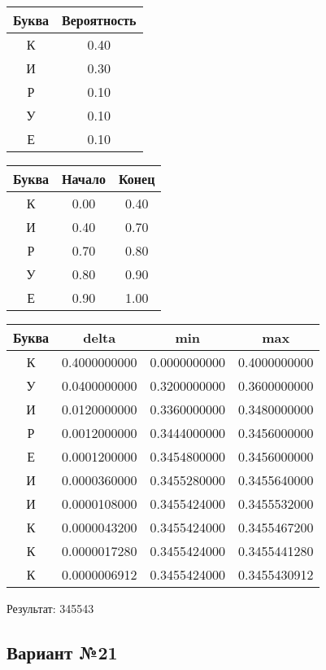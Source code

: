 \documentclass[a4paper, 12pt]{article}
\begin{document}
\begin{center}
 \begin{tabular}{ |c|c| } 
  \hline
     Буква & Вероятность \\ \hline
К & 0.40\\\hline
И & 0.30\\\hline
Р & 0.10\\\hline
У & 0.10\\\hline
Е & 0.10
\\ \hline \end{tabular}
\end{center}
\begin{center}
 \begin{tabular}{ |c|c|c| } 
  \hline
     Буква & Начало & Конец \\ \hline
К & 0.00 & 0.40\\\hline
И & 0.40 & 0.70\\\hline
Р & 0.70 & 0.80\\\hline
У & 0.80 & 0.90\\\hline
Е & 0.90 & 1.00
\\ \hline \end{tabular}
\end{center}
\begin{center}
 \begin{tabular}{ |c|c|c|c| } 
  \hline
     Буква & delta & min & max \\ \hline
К & 0.4000000000 & 0.0000000000 & 0.4000000000\\\hline
У & 0.0400000000 & 0.3200000000 & 0.3600000000\\\hline
И & 0.0120000000 & 0.3360000000 & 0.3480000000\\\hline
Р & 0.0012000000 & 0.3444000000 & 0.3456000000\\\hline
Е & 0.0001200000 & 0.3454800000 & 0.3456000000\\\hline
И & 0.0000360000 & 0.3455280000 & 0.3455640000\\\hline
И & 0.0000108000 & 0.3455424000 & 0.3455532000\\\hline
К & 0.0000043200 & 0.3455424000 & 0.3455467200\\\hline
К & 0.0000017280 & 0.3455424000 & 0.3455441280\\\hline
К & 0.0000006912 & 0.3455424000 & 0.3455430912
\\ \hline \end{tabular}
\end{center}
Результат: 345543
\pagebreak
\subsection{Вариант №21}
\end{document}
